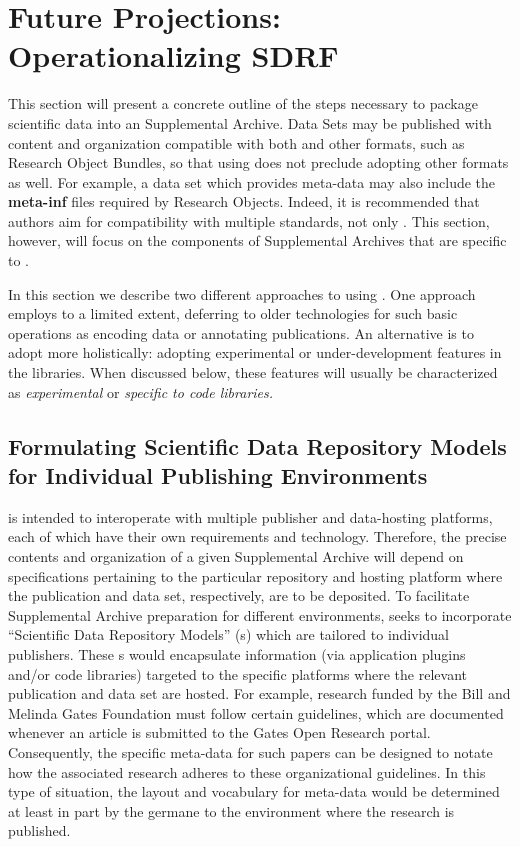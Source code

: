\documentclass[12pt,letterpaper]{article}
\newcommand{\ATexttclr}[1]{\textcolor{tcolor}{\textbf{#1}}}
\newcommand{\SDRM}{\resizebox{!}{8pt}{\ATexttclr{SDRM}}}
\newcommand{\lSDRF}{\resizebox{!}{8pt}{\ATexttclr{S}}\resizebox{!}{8pt}{\ATexttclr{DR%
\hspace{1pt}{\raisebox{-.5pt}{\fontfamily{qhv}\fontseries{b}\selectfont{}\Large{F}}%
}}}}
\newcommand{\SDRF}{\resizebox{!}{8pt}{\ATexttclr{S}}\resizebox{!}{8pt}{\ATexttclr{DR%
\hspace{1pt}{\raisebox{-1pt}{\fontfamily{qhv}\fontseries{b}\selectfont{}\Large{F}}%
}}}}
\newcommand{\p}[1]{

\vspace{.7em}#1}
\newcommand{\q}[1]{{\fontfamily{qcr}\selectfont ``}#1{\fontfamily{qcr}\selectfont ''}}
\begin{document}
{\vspace{-6pt}
\section{Future Projections: Operationalizing SDRF}

\p{This section will present a concrete outline of the steps 
necessary to package scientific data into an \SDRF{} Supplemental 
Archive.  Data Sets may be published with content and organization 
compatible with both \SDRF{} and other formats, such as 
Research Object Bundles, so that using \SDRF{} does not preclude 
adopting other formats as well.  For example, a data set which 
provides \SDRF{} meta-data may also include the \textbf{meta-inf} 
files required by Research Objects.  Indeed, it is recommended 
that authors aim for compatibility with multiple standards, 
not only \SDRF{}.  This section, however, will focus on the 
components of Supplemental Archives that are specific to \SDRF{}.}

\p{In this section we describe two different approaches to 
using \SDRF{}.  One approach employs \SDRF{} to a limited 
extent, deferring to older technologies for such basic 
operations as encoding data or annotating publications.  
An alternative is to adopt \SDRF{} more holistically: 
adopting experimental or under-development features in the 
\SDRF{} libraries.  When discussed below, these 
features will usually be characterized 
as \textit{experimental} or \textit{specific to \SDRF{} code libraries.}}

\subsection{Formulating Scientific Data Repository Models 
for Individual Publishing Environments}

\p{\lSDRF{} is intended to interoperate with multiple 
publisher and data-hosting platforms, each of which have 
their own requirements and technology.  Therefore, the 
precise contents and organization of a given \SDRF{} 
Supplemental Archive will depend on specifications 
pertaining to the particular repository and hosting platform 
where the publication and data set, respectively, 
are to be deposited.  To facilitate Supplemental Archive 
preparation for different environments, \SDRF{} 
seeks to incorporate \q{Scientific Data Repository Models} 
(\SDRM{}s) which are tailored to individual publishers.  
These \SDRM{}s would encapsulate information (via application 
plugins and/or code libraries) targeted 
to the specific platforms where the relevant publication 
and data set are hosted.  For example, research 
funded by the Bill and Melinda Gates Foundation 
must follow certain guidelines, which are 
documented whenever an article is submitted to the 
Gates Open Research portal.  Consequently, the 
specific \SDRF{} meta-data for such papers can 
be designed to notate how the associated research 
adheres to these organizational guidelines.  
In this type of situation, the layout and vocabulary 
for \SDRF{} meta-data would be determined 
at least in part by the \SDRM{} germane 
to the environment where the research is published.}

}
\end{document}
